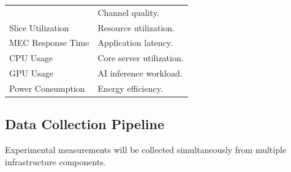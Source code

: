\documentclass[12pt,a4paper]{article}\usepackage[a4paper,margin=1in]{geometry}\usepackage{graphicx}\usepackage{longtable}\usepackage{booktabs}\usepackage{hyperref}\usepackage{enumitem}\usepackage{amsmath}\usepackage{tikz}\usepackage{pgfgantt}\usepackage{setspace}\setstretch{1.15}\usetikzlibrary{positioning,arrows.meta,shapes.geometric}
\begin{document}
\begin{table}[h]
\begin{tabular}{p{5cm}p{8cm}}
			&
			
			Channel quality.
			
			\\
			
			Slice Utilization
			
			&
			
			Resource utilization.
			
			\\
			
			MEC Response Time
			
			&
			
			Application latency.
			
			\\
			
			CPU Usage
			
			&
			
			Core server utilization.
			
			\\
			
			GPU Usage
			
			&
			
			AI inference workload.
			
			\\
			
			Power Consumption
			
			&
			
			Energy efficiency.
			
			\\
			
			\bottomrule
			
		\end{tabular}
		
	\end{table}
	
	
	\subsection{Data Collection Pipeline}
	
	Experimental measurements will be collected simultaneously from multiple infrastructure components.
	
\end{document}
